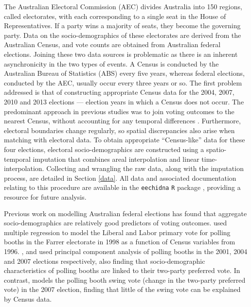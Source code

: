 \documentclass[times, doublespace]{anzsauth}
\begin{document}
The Australian Electoral Commission (AEC) divides Australia into 150 regions, called electorates, with each corresponding to a single seat in the House of Representatives. If a party wins a majority of seats, they become the governing party. Data on the socio-demographics of these electorates are derived from the Australian Census, and vote counts are obtained from Australian federal elections. Joining these two data sources is problematic as there is an inherent asynchronicity in the two types of events. A Census is conducted by the Australian Bureau of Statistics (ABS) every five years, whereas federal elections, conducted by the AEC, usually occur every three years or so. The first problem addressed is that of constructing appropriate Census data for the 2004, 2007, 2010 and 2013 elections --- election years in which a Census does not occur. The predominant approach in previous studies was to join voting outcomes to the nearest Census, without accounting for any temporal differences \citep[see][]{DavisStimson98, Stimson06, Liao09, Stimson09}. Furthermore, electoral boundaries change regularly, so spatial discrepancies also arise when matching with electoral data. To obtain appropriate ``Census-like'' data for these four elections, electoral socio-demographics are constructed using a spatio-temporal imputation that combines areal interpolation \citep{Goodchild1993} and linear time-interpolation. Collecting and wrangling the raw data, along with the imputation process, are detailed in Section \ref{data}. All data and associated documentation relating to this procedure are available in the \texttt{eechidna} \texttt{R} package \citep{eechidna}, providing a resource for future analysis.

Previous work on modelling Australian federal elections has found that aggregate socio-demographics are relatively good predictors of voting outcomes. \citet{Forrest01} used multiple regression to model the Liberal and Labor primary vote for polling booths in the Farrer electorate in 1998 as a function of Census variables from 1996. \citet{Stimson06}, \citet{Stimson09} and \citet{Stimson12} used principal component analysis of polling booths in the 2001, 2004 and 2007 elections respectively, also finding that socio-demographic characteristics of polling booths are linked to their two-party preferred vote. In contrast, \citet{Stimson09} models the polling booth swing vote (change in the two-party preferred vote) in the 2007 election, finding that little of the swing vote can be explained by Census data.
\end{document}
